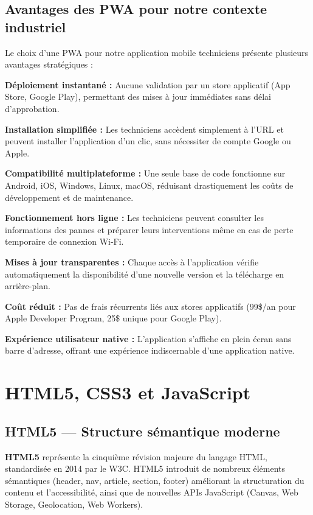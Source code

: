 \subsection{Avantages des PWA pour notre contexte industriel}

Le choix d'une PWA pour notre application mobile techniciens présente plusieurs avantages stratégiques :

\textbf{Déploiement instantané :} Aucune validation par un store applicatif (App Store, Google Play), permettant des mises à jour immédiates sans délai d'approbation.

\textbf{Installation simplifiée :} Les techniciens accèdent simplement à l'URL et peuvent installer l'application d'un clic, sans nécessiter de compte Google ou Apple.


\textbf{Compatibilité multiplateforme :} Une seule base de code fonctionne sur Android, iOS, Windows, Linux, macOS, réduisant drastiquement les coûts de développement et de maintenance.

\textbf{Fonctionnement hors ligne :} Les techniciens peuvent consulter les informations des pannes et préparer leurs interventions même en cas de perte temporaire de connexion Wi-Fi.

\textbf{Mises à jour transparentes :} Chaque accès à l'application vérifie automatiquement la disponibilité d'une nouvelle version et la télécharge en arrière-plan.

\textbf{Coût réduit :} Pas de frais récurrents liés aux stores applicatifs (99\$/an pour Apple Developer Program, 25\$ unique pour Google Play).

\textbf{Expérience utilisateur native :} L'application s'affiche en plein écran sans barre d'adresse, offrant une expérience indiscernable d'une application native.

\section{HTML5, CSS3 et JavaScript}

\subsection{HTML5 — Structure sémantique moderne}

\textbf{HTML5} représente la cinquième révision majeure du langage HTML, standardisée en 2014 par le W3C. HTML5 introduit de nombreux éléments sémantiques (header, nav, article, section, footer) améliorant la structuration du contenu et l'accessibilité, ainsi que de nouvelles APIs JavaScript (Canvas, Web Storage, Geolocation, Web Workers).

